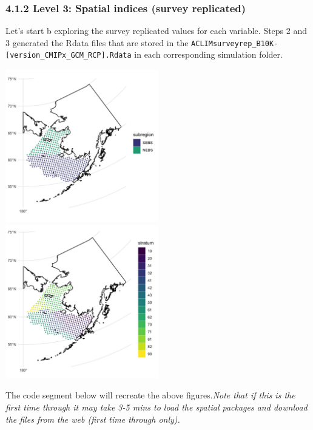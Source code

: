 \documentclass[
]{article}
\begin{document}
\hypertarget{level-3-spatial-indices-survey-replicated}{%
\subsubsection{4.1.2 Level 3: Spatial indices (survey
replicated)}\label{level-3-spatial-indices-survey-replicated}}

Let's start b exploring the survey replicated values for each variable.
Steps 2 and 3 generated the Rdata files that are stored in the
\texttt{ACLIMsurveyrep\_B10K-{[}version\_CMIPx\_GCM\_RCP{]}.Rdata} in
each corresponding simulation folder.

\includegraphics[width=0.5\textwidth,height=\textheight]{Figs/stations_NS.jpg}
\includegraphics[width=0.5\textwidth,height=\textheight]{Figs/stations.jpg}

The code segment below will recreate the above figures.\emph{Note that
if this is the first time through it may take 3-5 mins to load the
spatial packages and download the files from the web (first time through
only).}
\end{document}
